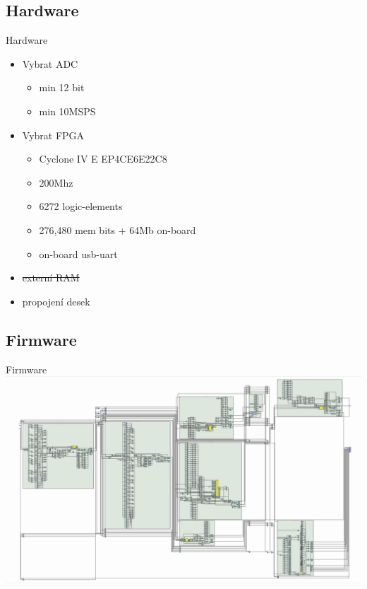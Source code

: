 \documentclass{beamer}
\begin{document}
	\subsection{Hardware}
	\begin{frame}{Hardware}
		\begin{itemize}
			\item Vybrat ADC
				\begin{itemize}
					\item min 12 bit 
					\item min 10MSPS
				\end{itemize}
			\item Vybrat FPGA
				\begin{itemize}
					\item Cyclone IV E EP4CE6E22C8
					\item 200Mhz
					\item 6272 logic-elements
					\item 276,480 mem bits + 64Mb on-board
					\item on-board usb-uart
				\end{itemize}			
			\item \sout{externí RAM} \pause
			\item propojení desek
		\end{itemize}
	\end{frame}
	
	
	\subsection{Firmware}
		\begin{frame}{Firmware}
			\includegraphics[width=\paperwidth]{rtl_fake.png}
		\end{frame}
\end{document}
